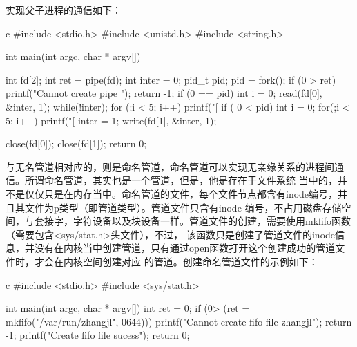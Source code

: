 实现父子进程的通信如下：
\begin{code-block}{c}
#include <stdio.h>
#include <unistd.h>
#include <string.h>

int main(int argc, char * argv[])
{
        int fd[2];
        int ret = pipe(fd);
        int inter = 0;
        pid_t pid;
        pid = fork();
        if (0 > ret)
        {
                printf("Cannot create pipe \n");
                return -1;
        }
        if (0 == pid)
        {
                int i = 0;
                read(fd[0], &inter, 1);
                while(!inter);
                for (;i < 5; i++)
                {
                        printf("[%
                }
        }
        if ( 0 < pid)
        {
                int i = 0;
                for(;i < 5; i++)
                {
                        printf("[%
                }
                inter = 1;
                write(fd[1], &inter, 1);
        }

        close(fd[0]);
        close(fd[1]);
        return 0;
}
\end{code-block}

与无名管道相对应的，则是命名管道，命名管道可以实现无亲缘关系的进程间通信。所谓命名管道，其实也是一个管道，但是，他是存在于文件系统
当中的，并不是仅仅只是在内存当中。命名管道的文件，每个文件节点都含有inode编号，并且其文件为p类型（即管道类型）。管道文件只含有inode
编号，不占用磁盘存储空间，与套接字，字符设备以及块设备一样。管道文件的创建，需要使用mkfifo函数（需要包含<sys/stat.h>头文件），不过，
该函数只是创建了管道文件的inode信息，并没有在内核当中创建管道，只有通过open函数打开这个创建成功的管道文件时，才会在内核空间创建对应
的管道。创建命名管道文件的示例如下：
\begin{code-block}{c}
#include <stdio.h>
#include <sys/stat.h>

int main(int argc, char * argv[])
{
        int ret = 0;
        if (0> (ret = mkfifo("/var/run/zhangjl", 0644)))
        {
                printf("Cannot create fifo file zhangjl\n");
                return -1;
        }
        printf("Create fifo file sucess\n");
        return 0;
}
\end{code-block}

